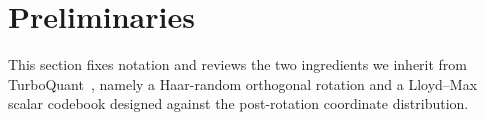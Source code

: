 

\vspace{-2mm}
\section{Preliminaries}
\label{sec:prelim}
\vspace{-1mm}
This section fixes notation and reviews the two ingredients we inherit from TurboQuant~\cite{zandieh2025turboquant}, namely a Haar-random orthogonal rotation and a Lloyd--Max scalar codebook designed against the post-rotation coordinate distribution.


